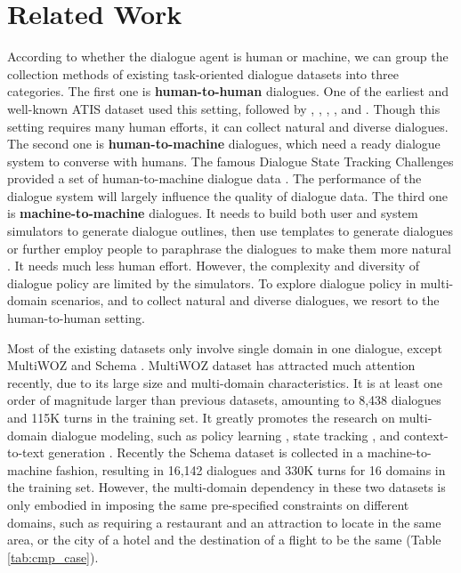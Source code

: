 \section{Related Work}
\label{section2}
According to whether the dialogue agent is human or machine, we can group the collection methods of existing task-oriented dialogue datasets into three categories. The first one is \textbf{human-to-human} dialogues. One of the earliest and well-known ATIS dataset \cite{ATIS1990}  used this setting, followed by \citet{frames2017}, \citet{KVRET2017}, \citet{Camrest2017}, \citet{dealornot2017}, \citet{MedicalCH2018} and \citet{Multiwoz2018}. Though this setting requires many human efforts, it can collect natural and diverse dialogues. The second one is \textbf{human-to-machine} dialogues, which need a ready dialogue system to converse with humans. The famous Dialogue State Tracking Challenges provided a set of human-to-machine dialogue data \cite{DSTC2013,DSTC2}. The performance of the dialogue system will largely influence the quality of dialogue data. The third one is \textbf{machine-to-machine} dialogues. It needs to build both user and system simulators to generate dialogue outlines, then use templates \cite{HRL} to generate dialogues or further employ people to paraphrase the dialogues to make them more natural \cite{M2M2018,SchemaGuided}. It needs much less human effort. However, the complexity and diversity of dialogue policy are limited by the simulators. To explore dialogue policy in multi-domain scenarios, and to collect natural and diverse dialogues, we resort to the human-to-human setting. 

Most of the existing datasets only involve single domain in one dialogue, except MultiWOZ \cite{Multiwoz2018} and Schema \cite{SchemaGuided}. MultiWOZ dataset has attracted much attention recently, due to its large size and multi-domain characteristics. It is at least one order of magnitude larger than previous datasets, amounting to 8,438 dialogues and 115K turns in the training set. It greatly promotes the research on multi-domain dialogue modeling, such as policy learning \cite{takanobu2019guided}, state tracking \cite{TRADE}, and context-to-text generation \cite{MDRG}. Recently the Schema dataset is collected in a machine-to-machine fashion, resulting in 16,142 dialogues and 330K turns for 16 domains in the training set. However, the multi-domain dependency in these two datasets is only embodied in imposing the same pre-specified constraints on different domains, such as requiring a restaurant and an attraction to locate in the same area, or the city of a hotel and the destination of a flight to be the same (Table \ref{tab:cmp_case}).


